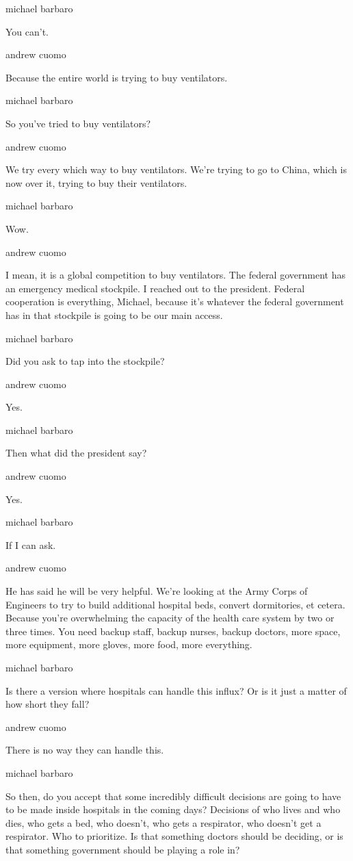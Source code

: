 michael barbaro

You can't.

andrew cuomo

Because the entire world is trying to buy ventilators.

michael barbaro

So you've tried to buy ventilators?

andrew cuomo

We try every which way to buy ventilators. We're trying to go to China,
which is now over it, trying to buy their ventilators.

michael barbaro

Wow.

andrew cuomo

I mean, it is a global competition to buy ventilators. The federal
government has an emergency medical stockpile. I reached out to the
president. Federal cooperation is everything, Michael, because it's
whatever the federal government has in that stockpile is going to be our
main access.

michael barbaro

Did you ask to tap into the stockpile?

andrew cuomo

Yes.

michael barbaro

Then what did the president say?

andrew cuomo

Yes.

michael barbaro

If I can ask.

andrew cuomo

He has said he will be very helpful. We're looking at the Army Corps of
Engineers to try to build additional hospital beds, convert dormitories,
et cetera. Because you're overwhelming the capacity of the health care
system by two or three times. You need backup staff, backup nurses,
backup doctors, more space, more equipment, more gloves, more food, more
everything.

michael barbaro

Is there a version where hospitals can handle this influx? Or is it just
a matter of how short they fall?

andrew cuomo

There is no way they can handle this.

michael barbaro

So then, do you accept that some incredibly difficult decisions are
going to have to be made inside hospitals in the coming days? Decisions
of who lives and who dies, who gets a bed, who doesn't, who gets a
respirator, who doesn't get a respirator. Who to prioritize. Is that
something doctors should be deciding, or is that something government
should be playing a role in?

